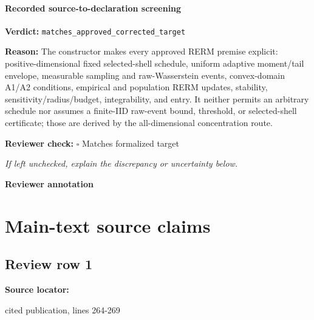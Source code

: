 \documentclass[10pt]{article}
\newcommand{\reviewerbox}{%
  \par\noindent\fbox{\parbox{0.96\linewidth}{\rule{0pt}{0.38in}}}\par
}
\newcommand{\reviewmatch}[1]{%
  \par\noindent\textbf{Reviewer check:} $\square$\; #1\par
  \noindent\emph{If left unchecked, explain the discrepancy or uncertainty below.}\par
}
\begin{document}
\paragraph{Recorded source-to-declaration screening}
\textbf{Verdict:} \texttt{matches\_approved\_corrected\_target}
\\
{\raggedright
\textbf{Reason:} The constructor makes every approved RERM premise explicit:\allowbreak{} positive-\allowbreak{}dimensional fixed selected-\allowbreak{}shell schedule, uniform adaptive moment/\allowbreak{}tail envelope, measurable sampling and raw-\allowbreak{}Wasserstein events, convex-\allowbreak{}domain A1/\allowbreak{}A2 conditions, empirical and population RERM updates, stability, sensitivity/\allowbreak{}radius/\allowbreak{}budget, integrability, and entry.\allowbreak{} It neither permits an arbitrary schedule nor assumes a finite-\allowbreak{}IID raw-\allowbreak{}event bound, threshold, or selected-\allowbreak{}shell certificate;\allowbreak{} those are derived by the all-\allowbreak{}dimensional concentration route.\allowbreak{}
\par}
\reviewmatch{Matches formalized target}
\noindent\textbf{Reviewer annotation}\par
\reviewerbox

\clearpage
\hypertarget{source-claim-5b4f70cb8ea743cb}{}
\hypertarget{source-section-0c7af8265958a9ea}{}
\section*{Main-text source claims}
\subsection*{Review row 1}
\textbf{Source locator:} {\footnotesize\raggedright cited publication, lines 264-\allowbreak{}269\par}
\end{document}
